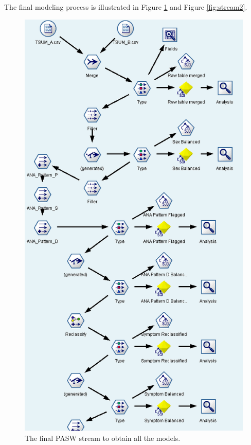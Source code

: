 \documentclass[12pt]{article}
\begin{document}
The final modeling process is illustrated in Figure \ref{fig:stream1} and Figure \ref{fig:stream2}.
\begin{figure}[!ht]
\begin{center}
\includegraphics[width=.7\textwidth]{fig/pasw_stream_1.png}
\caption{The final PASW stream to obtain all the models.}
\label{fig:stream1}
\end{center}
\end{figure}
\end{document}
